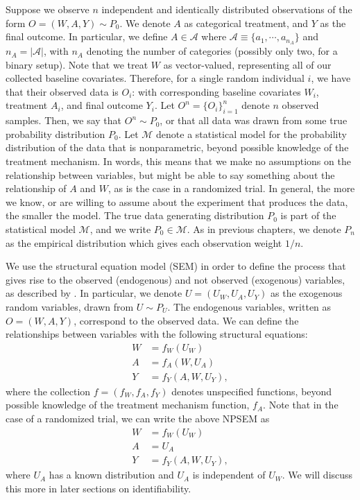 \documentclass[
  12pt, krantz2,
]{krantz}
\newcommand{\1}{\mathbbm{1}}
\theoremstyle{definition}
\theoremstyle{definition}
\theoremstyle{definition}
\theoremstyle{definition}
\theoremstyle{remark}
\begin{document}
Suppose we observe \(n\) independent and identically distributed observations of
the form \(O=(W,A,Y) \sim P_0\). We denote \(A\) as categorical treatment, and \(Y\)
as the final outcome. In particular, we define \(A \in \mathcal{A}\) where
\(\mathcal{A} \equiv \{a_1, \cdots, a_{n_A} \}\) and \(n_A = |\mathcal{A}|\), with
\(n_A\) denoting the number of categories (possibly only two, for a binary setup).
Note that we treat \(W\) as vector-valued, representing all of our collected
baseline covariates. Therefore, for a single random individual \(i\), we have that
their observed data is \(O_i\): with corresponding baseline covariates \(W_i\),
treatment \(A_i\), and final outcome \(Y_i\). Let \(O^n = \{O_i\}_{i=1}^n\) denote
\(n\) observed samples. Then, we say that \(O^n \sim P_0\), or that all
data was drawn from some true probability distribution \(P_0\). Let \(\mathcal{M}\)
denote a statistical model for the probability distribution of the data that is
nonparametric, beyond possible knowledge of the treatment mechanism. In words, this
means that we make no assumptions on the relationship between variables, but might
be able to say something about the relationship of \(A\) and \(W\), as is the case in
a randomized trial. In general, the more we know, or are willing to assume about the
experiment that produces the data, the smaller the model. The true data generating
distribution \(P_0\) is part of the statistical model \(\mathcal{M}\), and we write
\(P_0 \in \mathcal{M}\). As in previous chapters, we denote \(P_n\) as the empirical distribution
which gives each observation weight \(1/n\).

We use the structural equation model (SEM) in order to define
the process that gives rise to the observed (endogenous) and not observed
(exogenous) variables, as described by \citet{pearl2009causality}. In particular, we
denote \(U=(U_W,U_A,U_Y)\) as the exogenous random variables, drawn from \(U \sim P_U\).
The endogenous variables, written as \(O=(W,A,Y)\), correspond to the observed data.
We can define the relationships between variables with the following structural equations:
\begin{align}
  W &= f_W(U_W) \\ A &= f_A(W, U_A) \\ Y &= f_Y(A, W, U_Y),
  \label{eq:npsem-mopttx}
\end{align}
where the collection \(f=(f_W,f_A,f_Y)\) denotes unspecified functions, beyond possible
knowledge of the treatment mechanism function, \(f_A\). Note that
in the case of a randomized trial, we can write the above NPSEM as
\begin{align}
  W &= f_W(U_W) \\ A &= U_A \\ Y &= f_Y(A, W, U_Y),
  \label{eq:npsem-rt-mopttx}
\end{align}
where \(U_A\) has a known distribution and \(U_A\) is independent of \(U_W\). We will discuss
this more in later sections on identifiability.
\end{document}
